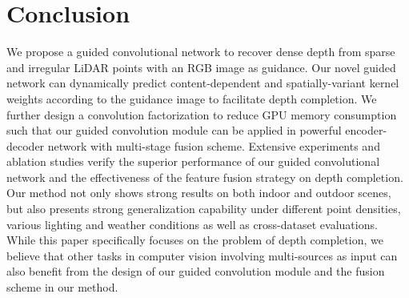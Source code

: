 \documentclass[journal]{IEEEtran}
\begin{document}
\section{Conclusion}
We propose a guided convolutional network to recover dense depth from sparse and irregular LiDAR points with an RGB image as guidance.
Our novel guided network can dynamically predict content-dependent and spatially-variant kernel weights according to the guidance image to facilitate depth completion.
We further design a convolution factorization to reduce GPU memory consumption
such that our guided convolution module can be applied in powerful encoder-decoder network with multi-stage fusion scheme.
Extensive experiments and ablation studies verify the superior performance of our guided convolutional network and the effectiveness of the feature fusion strategy on depth completion.
Our method not only shows strong results on both indoor and outdoor scenes,
but also presents strong generalization capability under different point densities, various lighting and weather conditions as well as cross-dataset evaluations.
While this paper specifically focuses on the problem of depth completion,
we believe that other tasks in computer vision involving multi-sources as input can also benefit from the design of our guided convolution module and the fusion scheme in our method. 
\ifCLASSOPTIONcaptionsoff
  \newpage
\fi












\end{document}
